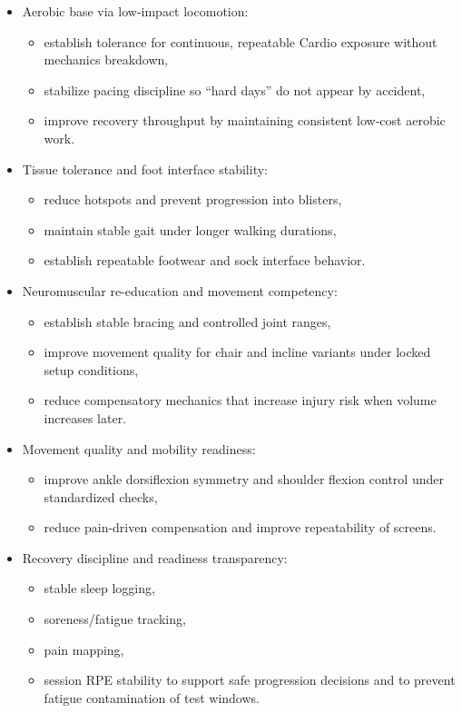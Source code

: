 \documentclass[10pt]{article}
\begin{document}
\begin{itemize}
\item Aerobic base via low-impact locomotion:
  \begin{itemize}
  \item establish tolerance for continuous, repeatable Cardio exposure without mechanics breakdown,
  \item stabilize pacing discipline so “hard days” do not appear by accident,
  \item improve recovery throughput by maintaining consistent low-cost aerobic work.
  \end{itemize}

\item Tissue tolerance and foot interface stability:
  \begin{itemize}
  \item reduce hotspots and prevent progression into blisters,
  \item maintain stable gait under longer walking durations,
  \item establish repeatable footwear and sock interface behavior.
  \end{itemize}

\item Neuromuscular re-education and movement competency:
  \begin{itemize}
  \item establish stable bracing and controlled joint ranges,
  \item improve movement quality for chair and incline variants under locked setup conditions,
  \item reduce compensatory mechanics that increase injury risk when volume increases later.
  \end{itemize}

\item Movement quality and mobility readiness:
  \begin{itemize}
  \item improve ankle dorsiflexion symmetry and shoulder flexion control under standardized checks,
  \item reduce pain-driven compensation and improve repeatability of screens.
  \end{itemize}

\item Recovery discipline and readiness transparency:
  \begin{itemize}
  \item stable sleep logging,
  \item soreness/fatigue tracking,
  \item pain mapping,
  \item session RPE stability to support safe progression decisions and to prevent fatigue contamination of test windows.
  \end{itemize}


\end{itemize}
\end{document}
